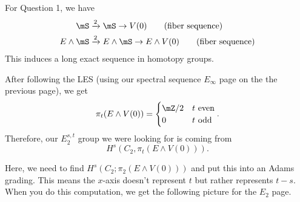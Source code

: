 For Question 1, we have 
\begin{align*}
    \mS&\xr{2}\mS\to V(0)\tag{fiber sequence}\\
    E\wedge \mS&\xr{2}E\wedge \mS \to E\wedge V(0)\tag{fiber sequence}
\end{align*}
This induces a long exact sequence in homotopy groups. 
\begin{center}
\end{center}
After following the LES (using our spectral sequence $E_\infty$ page on the the previous page), we get $$\pi_t(E\wedge V(0)) = \begin{cases}
    \mZ/2 & t\text{ even}\\
    0 & t\text{ odd}
\end{cases}.$$
Therefore, our $E_2^{s,t}$ group we were looking for is coming from $$H^s(C_2,\pi_t(E\wedge V(0))).$$

\begin{center}
\end{center}

Here, we need to find $H^s(C_2;\pi_2(E\wedge V(0)))$ and put this into an Adams grading. This means the $x$-axis doesn't represent $t$ but rather represents $t-s$.  When you do this computation, we get the following picture for the $E_2$ page. 
\DeclareSseqGroup{}

